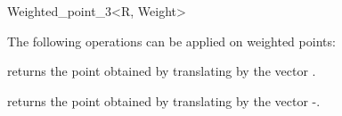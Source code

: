 \begin{ccRefClass} {Weighted_point_3<R, Weight>}

The following operations can be applied on weighted points:

       {returns the point obtained by translating  by the 
        vector .}

       {returns the point obtained by translating  by the 
        vector -.}

\ccSeeAlso

 \\

\end{ccRefClass} 

